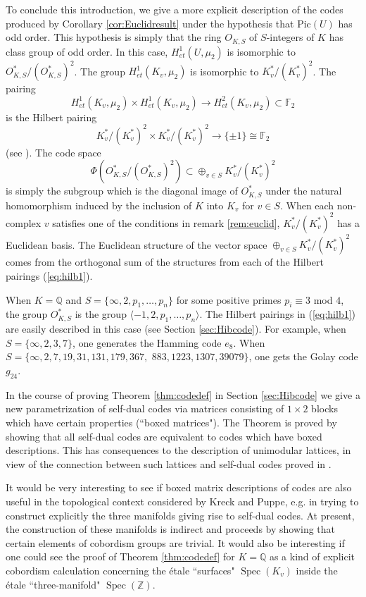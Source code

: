 \documentclass[noams]{compositio}
\theoremstyle{definition} %
\theoremstyle{remark} %
\DeclareMathOperator{\Spec}{\mathrm{Spec}}
\newcommand{\F}{\mathbb{F}}
\newcommand{\Q}{\mathbb{Q}}
\newcommand{\Z}{\mathbb{Z}}
\begin{document}
To conclude this introduction, we give a more explicit description of the codes produced by Corollary \ref{cor:Euclidresult}
under the hypothesis that  $\mathrm{Pic}(U)$ has odd order.  This hypothesis is simply that the ring $O_{K,S}$
of $S$-integers of $K$ has class group of odd order.  In this case, $H^1_{et}(U,\mu_2)$ is isomorphic to $O_{K,S}^*/(O_{K,S}^*)^2$.  The group $H^1_{et}(K_v,\mu_2)$ is isomorphic to $K_v^*/(K_v^*)^2$.  The pairing
$$H^1_{et}(K_v,\mu_2) \times H^1_{et}(K_v,\mu_2) \to H^2_{et}(K_v,\mu_2) \subset \F_2$$ is  the Hilbert pairing
\begin{equation}
\label{eq:hilb1}
K_v^*/(K_v^*)^2 \times K_v^*/(K_v^*)^2 \to \{\pm 1\} \cong \F_2
\end{equation} 
(see \cite[chap. XIV]{Serre1968}).   The code space
$$\Phi(O_{K,S}^*/(O_{K,S}^*)^2) \subset \oplus_{v \in S} K_v^*/(K_v^*)^2$$
is simply the subgroup  which is the diagonal image of $O_{K,S}^*$ under the
natural homomorphism induced by the inclusion of $K$ into $K_v$ for $v \in S$.
When each non-complex $v$ satisfies one of the conditions in remark \ref{rem:euclid}, $K_v^*/(K_v^*)^2$ has a Euclidean basis. 
The Euclidean structure of the vector space $\oplus_{v \in S} K_v^*/(K_v^*)^2$ comes from the orthogonal
sum of the structures from each of the Hilbert pairings (\ref{eq:hilb1}).

When $K = \Q$
and $S = \{\infty , 2, p_1, \ldots, p_n\}$ for some positive primes $p_i \equiv 3$ mod $4$,  the
group $O_{K,S}^*$ is the group $\langle -1, 2, p_1,\ldots,p_n\rangle $.   The Hilbert
pairings in (\ref{eq:hilb1}) are easily described in this case (see  Section \ref{sec:Hibcode}).
For example, when $S=\{\infty, 2, 3, 7\}$, one generates the Hamming code $e_8$. When $S=\{\infty, 2, 7, 19, 31, 131, 179, 367,$ $883, 1223, 1307, 39079\}$, one gets the Golay code $g_{24}$.


In the course of proving Theorem \ref{thm:codedef}
in Section \ref{sec:Hibcode} we give a new parametrization of self-dual codes via matrices consisting
of $1 \times 2$ blocks which have certain properties (``boxed matrices").  The Theorem is proved by showing that all
self-dual codes are equivalent to codes which have boxed descriptions.   This has consequences
to the description of unimodular lattices, in view of the connection between such lattices
and self-dual codes proved in \cite{Kitazume1991}.


It would be very interesting
to see if boxed matrix descriptions of codes are also useful in the topological context
considered by Kreck and Puppe, e.g. in trying to construct explicitly the three manifolds
giving rise to self-dual codes.  At present, the construction of these manifolds is indirect and
proceeds by showing
that certain elements of cobordism groups are trivial. It would also be interesting if one could
see the proof of Theorem \ref{thm:codedef} for $K = \mathbb{Q}$ as a kind of explicit cobordism
calculation concerning the \'etale ``surfaces" $\Spec(K_v)$ inside the \'etale ``three-manifold" $\Spec(\Z)$.
\end{document}
